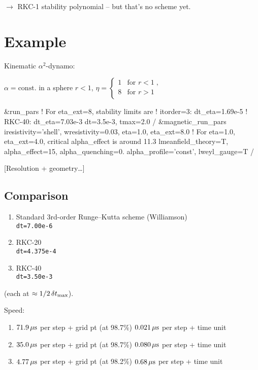 \documentclass[\mydriver,12pt,twoside,notitlepage]{article}
\newcommand{\BoxLabel}[1]{\fbox{\rmfamily\emph{#1}}}
\begin{document}
$\rightarrow$ RKC-1 stability polynomial
-- but that's no scheme yet.



\section{Example}

Kinematic $\alpha^2$-dynamo:

$\alpha=\mathrm{const.}$ in a sphere $r<1$,
\qquad
$\eta = \begin{cases}
    1 & \text{for $r<1$} \; , \\
    8 & \text{for $r>1$}\\
  \end{cases}$

\medskip

{\small\color{DarkBlue}
\begin{CodeVerbatim}[label=\BoxLabel{run.in}]
  &run_pars
    ! For eta_ext=8, stability limits are
    !   itorder=3:  dt_eta=1.69e-5
    !   RKC-40:     dt_eta=7.03e-3
    dt=3.5e-3, tmax=2.0
  /
  &magnetic_run_pars
    iresistivity='shell', wresistivity=0.03,
    eta=1.0, eta_ext=8.0
    ! For eta=1.0, eta_ext=4.0, critical alpha_effect is around 11.3
    lmeanfield_theory=T, alpha_effect=15, alpha_quenching=0.
    alpha_profile='const', lweyl_gauge=T
  /
\end{CodeVerbatim}
}

[Resolution + geometry\ldots]


\subsection{Comparison}
\begin{enumerate}
\item Standard 3rd-order Runge--Kutta scheme (Williamson)\\
  \texttt{dt=7.00e-6}
\item RKC-20\\
  \texttt{dt=4.375e-4}
\item RKC-40\\
  \texttt{dt=3.50e-3}
\end{enumerate}
(each at $\approx 1/2\,\delta t_{\rm max}$).

Speed:
\begin{enumerate}
\item $\unit[71.9]{\mu s}$ per step + grid pt   
  (at 98.7\%)
  \RedArrow $\unit[0.021]{\mu s}$ per step + time unit
\item $\unit[35.0]{\mu s}$ per step + grid pt
  (at 98.7\%)
  \RedArrow $\unit[0.080]{\mu s}$ per step + time unit
\item $\unit[4.77]{\mu s}$ per step + grid pt
  (at 98.2\%)
  \RedArrow $\unit[0.68]{\mu s}$ per step + time unit
\end{enumerate}
\bigskip
\end{document}

